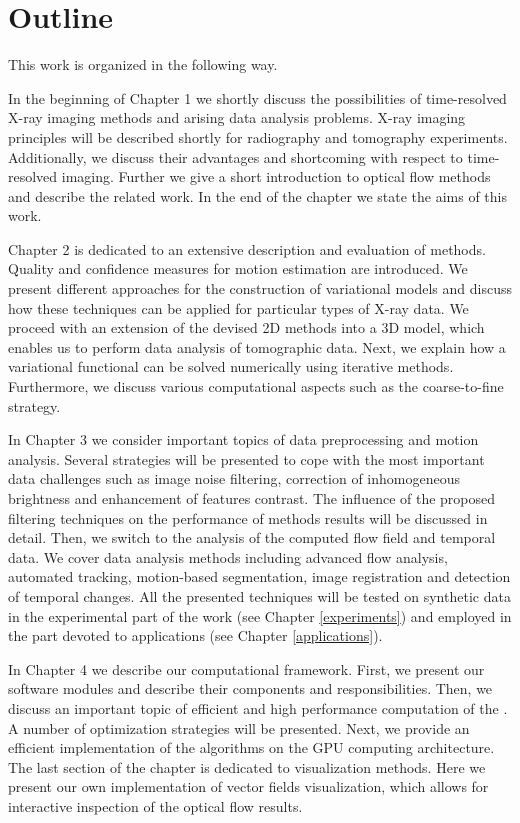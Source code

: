 \section{Outline}
This work is organized in the following way.

In the beginning of Chapter 1 we shortly discuss the possibilities of time-resolved X-ray imaging methods and arising data analysis problems. X-ray imaging principles will be described shortly for radiography and tomography experiments. Additionally, we discuss their advantages and shortcoming with respect to time-resolved imaging. Further we give a short introduction to optical flow methods and describe the related work. In the end of the chapter we state the aims of this work.

Chapter 2 is dedicated to an extensive description and evaluation of \opticalflow methods. Quality and confidence measures for motion estimation are introduced.  We present different approaches for the construction of variational models and discuss how these techniques can be applied for particular types of X-ray data. We proceed with an extension of the devised 2D methods into a 3D model, which enables us to perform data analysis of tomographic data.  Next, we explain how a variational functional can be solved numerically using iterative methods. Furthermore, we discuss various computational aspects such as the coarse-to-fine strategy.

In Chapter 3 we consider important topics of data preprocessing and motion analysis. Several strategies will be presented to cope with the most important data challenges such as image noise filtering, correction of inhomogeneous brightness and enhancement of features contrast. The influence of the proposed filtering techniques on the performance of \opticalflow methods results will be discussed in detail. Then, we switch to the analysis of the computed flow field and temporal data.  We cover data analysis methods including advanced flow analysis, automated tracking,  motion-based segmentation, image registration and detection of temporal changes. All the presented techniques will be tested on synthetic data in the experimental part of the work (see Chapter \ref{experiments}) and employed in the part devoted to applications (see Chapter \ref{applications}).

In Chapter 4 we describe our computational framework. First, we present our software modules and describe their components and responsibilities. Then, we discuss an important topic of efficient and high performance computation of the \opticalflow. A number of optimization strategies will be presented. Next, we provide an efficient implementation of the \opticalflow algorithms on the GPU computing architecture. The last section of the chapter is dedicated to visualization methods. Here we present our own implementation of vector fields visualization, which allows for interactive inspection of the optical flow results.

